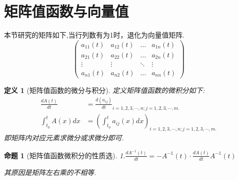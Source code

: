 \documentclass[12pt, a4paper, oneside]{ctexbook}
\newtheorem{definition}[theorem]{定义}
\newtheorem{proposition}[theorem]{命题}
\begin{document}
    \section{矩阵值函数与向量值}
        本节研究的矩阵如下,当行列数有为1时，退化为向量值矩阵.
        \[
            \begin{pmatrix}
            a_{11}(t) & a_{12}(t) & \dots & a_{1n}(t) \\
            a_{21}(t) & a_{22}(t) & \dots & a_{2n}(t) \\
            \vdots & \vdots & \ddots & \vdots \\
            a_{n1}(t) & a_{n2}(t) & \dots & a_{nn}(t)
            \end{pmatrix}
        \]
        \begin{definition}[矩阵值函数的微分与积分]
            定义矩阵值函数的微积分如下:
            \begin{align}
            \frac{dA(t)}{dt}&=\frac{d(a_{ij})}{dt}_{i=1,2,3,\cdots,n;j = 1,2,3,\cdots,m.}\\
            \int^t_{t_0}A(x)dx&=(\int^t_{t_0}a_{ij}(x)dx)_{i=1,2,3,\cdots,n;j=1,2,3,\cdots,m.}
            \end{align}
            即矩阵内对应元素求微分或求微分即可.
        \end{definition}
        \begin{proposition}[矩阵值函数微积分的性质选]
            1.$ \frac{dA^{-1}(t)}{dt}=-A^{-1 }(t)\cdot\frac{dA(t)}{dt}A^{-1}(t) $ \par
            其原因是矩阵左右乘的不相等.
        \end{proposition}
\end{document}
